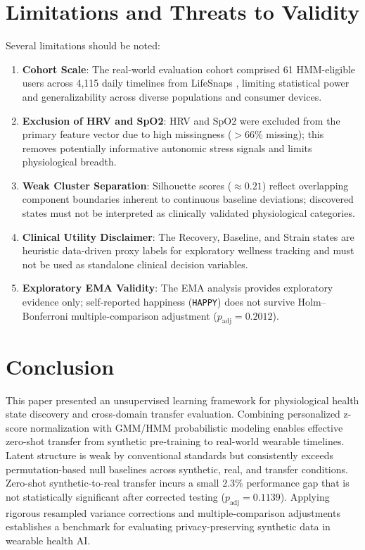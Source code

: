 \documentclass[conference]{IEEEtran}
\begin{document}
\section{Limitations and Threats to Validity}
Several limitations should be noted:
\begin{enumerate}
    \item \textbf{Cohort Scale}: The real-world evaluation cohort comprised 61 HMM-eligible users across 4,115 daily timelines from LifeSnaps \cite{b15}, limiting statistical power and generalizability across diverse populations and consumer devices.
    \item \textbf{Exclusion of HRV and SpO2}: HRV and SpO2 were excluded from the primary feature vector due to high missingness ($>66\%$ missing); this removes potentially informative autonomic stress signals and limits physiological breadth.
    \item \textbf{Weak Cluster Separation}: Silhouette scores ($\approx 0.21$) reflect overlapping component boundaries inherent to continuous baseline deviations; discovered states must not be interpreted as clinically validated physiological categories.
    \item \textbf{Clinical Utility Disclaimer}: The Recovery, Baseline, and Strain states are heuristic data-driven proxy labels for exploratory wellness tracking and must not be used as standalone clinical decision variables.
    \item \textbf{Exploratory EMA Validity}: The EMA analysis provides exploratory evidence only; self-reported happiness (\texttt{HAPPY}) does not survive Holm--Bonferroni multiple-comparison adjustment ($p_{\text{adj}} = 0.2012$).
\end{enumerate}

\section{Conclusion}
This paper presented an unsupervised learning framework for physiological health state discovery and cross-domain transfer evaluation. Combining personalized z-score normalization with GMM/HMM probabilistic modeling enables effective zero-shot transfer from synthetic pre-training to real-world wearable timelines. Latent structure is weak by conventional standards but consistently exceeds permutation-based null baselines across synthetic, real, and transfer conditions. Zero-shot synthetic-to-real transfer incurs a small 2.3\% performance gap that is not statistically significant after corrected testing ($p_{\text{adj}} = 0.1139$). Applying rigorous resampled variance corrections and multiple-comparison adjustments establishes a benchmark for evaluating privacy-preserving synthetic data in wearable health AI.
\end{document}
